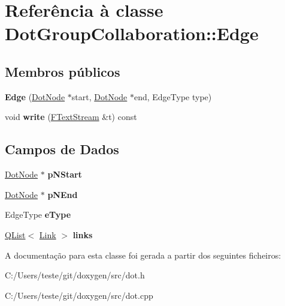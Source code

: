 \hypertarget{class_dot_group_collaboration_1_1_edge}{\section{Referência à classe Dot\-Group\-Collaboration\-:\-:Edge}
\label{class_dot_group_collaboration_1_1_edge}
}
\subsection*{Membros públicos}
\begin{DoxyCompactItemize}
\item 
\hypertarget{class_dot_group_collaboration_1_1_edge_a1399449b9e5f633b5bb942cc7e9183bd}{{\bfseries Edge} (\hyperlink{class_dot_node}{Dot\-Node} $\ast$start, \hyperlink{class_dot_node}{Dot\-Node} $\ast$end, Edge\-Type type)}\label{class_dot_group_collaboration_1_1_edge_a1399449b9e5f633b5bb942cc7e9183bd}

\item 
\hypertarget{class_dot_group_collaboration_1_1_edge_aa118f11bc90190461bbc0fba3fbe8b58}{void {\bfseries write} (\hyperlink{class_f_text_stream}{F\-Text\-Stream} \&t) const }\label{class_dot_group_collaboration_1_1_edge_aa118f11bc90190461bbc0fba3fbe8b58}

\end{DoxyCompactItemize}
\subsection*{Campos de Dados}
\begin{DoxyCompactItemize}
\item 
\hypertarget{class_dot_group_collaboration_1_1_edge_a3f08b466c40f5471bdeb24862b6ba1ec}{\hyperlink{class_dot_node}{Dot\-Node} $\ast$ {\bfseries p\-N\-Start}}\label{class_dot_group_collaboration_1_1_edge_a3f08b466c40f5471bdeb24862b6ba1ec}

\item 
\hypertarget{class_dot_group_collaboration_1_1_edge_a18ad99735bc66264827ff697b7acb56d}{\hyperlink{class_dot_node}{Dot\-Node} $\ast$ {\bfseries p\-N\-End}}\label{class_dot_group_collaboration_1_1_edge_a18ad99735bc66264827ff697b7acb56d}

\item 
\hypertarget{class_dot_group_collaboration_1_1_edge_ae48f8777b221a50f7252458723a66c97}{Edge\-Type {\bfseries e\-Type}}\label{class_dot_group_collaboration_1_1_edge_ae48f8777b221a50f7252458723a66c97}

\item 
\hypertarget{class_dot_group_collaboration_1_1_edge_a2c79c4abca703b5da3ea629dbf9f6d6b}{\hyperlink{class_q_list}{Q\-List}$<$ \hyperlink{class_dot_group_collaboration_1_1_link}{Link} $>$ {\bfseries links}}\label{class_dot_group_collaboration_1_1_edge_a2c79c4abca703b5da3ea629dbf9f6d6b}

\end{DoxyCompactItemize}


A documentação para esta classe foi gerada a partir dos seguintes ficheiros\-:\begin{DoxyCompactItemize}
\item 
C\-:/\-Users/teste/git/doxygen/src/dot.\-h\item 
C\-:/\-Users/teste/git/doxygen/src/dot.\-cpp\end{DoxyCompactItemize}
